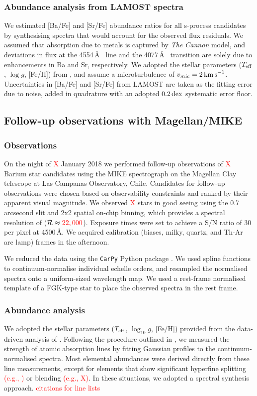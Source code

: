 \documentclass[a4paper,fleqn,usenatbib]{mnras}
\newcommand{\todo}[1]{\textcolor{red}{#1}}
\begin{document}
\subsubsection{Abundance analysis from LAMOST spectra}
We estimated [Ba/Fe] and [Sr/Fe] abundance ratios for all s-process candidates by synthesising spectra that would account for the observed flux residuals. We assumed that absorption due to metals is captured by \emph{The Cannon} model, and deviations in flux at the 4554\,\AA\  line and the 4077\,\AA\  transition are solely due to enhancements in Ba and Sr, respectively\citep{marcs,sme,vald,ispec}. We adopted the stellar parameters ($T_{\rm eff}$, $\log{g}$, [Fe/H]) from \citep{ho2017}, and assume a microturbulence of $v_{mic} = 2\,{\rm km\,s}^{-1}$. Uncertainties in [Ba/Fe] and [Sr/Fe] from LAMOST are taken as the fitting error due to noise, added in quadrature with an adopted $0.2\,{\rm dex}$ systematic error floor.


\subsection{Follow-up observations with Magellan/MIKE}

\subsubsection{Observations}
On the night of \todo{X} January 2018 we performed follow-up observations of \todo{X} Barium star candidates using the MIKE spectrograph on the Magellan Clay telescope at Las Campanas Observatory, Chile. Candidates for follow-up observations were chosen based on observability constraints and ranked by their apparent visual magnitude. We observed \todo{X} stars in good seeing using the 0.7 arcsecond slit and 2x2 spatial on-chip binning, which provides a spectral resolution of ($\mathcal{R} \approx \todo{22,000}$). Exposure times were set to achieve a S/N ratio of 30 per pixel at 4500\,\AA. We acquired calibration (biases, milky, quartz, and Th-Ar arc lamp) frames in the afternoon.

We reduced the data using the \texttt{CarPy} Python package \citep{kelson2000,kelson2003}. We used spline functions to continuum-normalise individual echelle orders, and resampled the normalised spectra onto a uniform-sized wavelength map. We used a rest-frame normalised template of a FGK-type star to place the observed spectra in the rest frame.


\subsubsection{Abundance analysis}
We adopted the stellar parameters ($T_{\rm eff}$, $\log_{10}g$, [Fe/H]) provided from the data-driven analysis of \citep{ho2017}. Following the procedure outlined in \citep{casey2014}, we measured the strength of atomic absorption lines by fitting Gaussian profiles to the continuum-normalised spectra. Most elemental abundances were derived directly from these line measurements, except for elements that show significant hyperfine splitting \todo{(e.g., )} or blending \todo{(e.g., X)}. In these situations, we adopted a spectral synthesis approach. \todo{citations for line lists}
\end{document}
